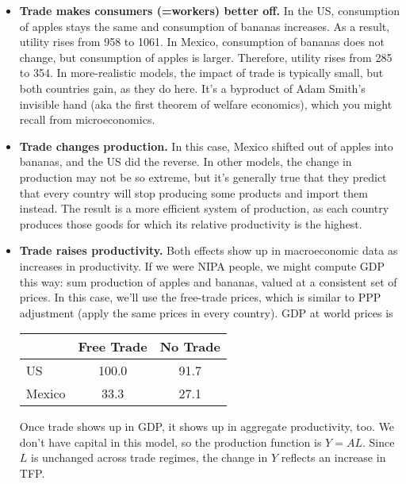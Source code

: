 \begin{itemize}

\item \textbf{Trade makes consumers (=workers) better off.}
In the US, consumption of apples stays the same and consumption of
bananas increases. As a result, utility rises from 958 to 1061. In
Mexico, consumption of bananas does not change, but consumption of
apples is larger. Therefore, utility rises from 285 to 354. In
more-realistic models, the impact of trade is typically small,
but both countries gain, as they do here.
It's a byproduct of Adam Smith's invisible hand (aka the first
theorem of welfare economics), which you might recall from microeconomics.

\item \textbf{Trade changes production.}  In this
case, Mexico shifted out of apples into bananas, and the US did the reverse.
In other models, the change in production may not be
so extreme, but it's generally true that they predict that every
country will stop producing some products and import them
instead.  The result is a more efficient system of production,
as each country produces those goods for which its relative
productivity is the highest.

\item {\bf Trade raises productivity.}
Both effects show up in macroeconomic data as increases in
productivity.  If we were NIPA people, we might compute GDP this way:  sum production of apples and bananas, valued at a
consistent set of prices.  In this case, we'll use the free-trade
prices, which is similar to PPP adjustment (apply the
same prices in every country).  GDP at world prices is
%
%
\begin{center}
\begin{tabular}{lcc}
\toprule
                    &      Free Trade     &    No Trade    \\%

\midrule%
US                  &         100.0       &      91.7      \\%
%
Mexico              &          33.3       &      27.1      \\%
\bottomrule
\end{tabular}
\end{center}
%
%
Once trade shows up in GDP, it shows up in aggregate
productivity, too.  We don't have capital in this model, so the
production function is $Y = AL$.  Since $L$ is unchanged across
trade regimes, the change in $Y$ reflects an increase in TFP.


\end{itemize}
